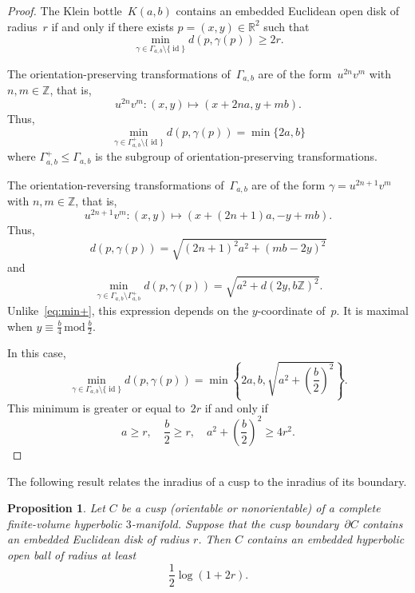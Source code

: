 \documentclass[11pt,reqno]{amsart}
\newtheorem{proposition}[theorem]{Proposition}
\theoremstyle{definition}
\numberwithin{equation}{section}
\newcommand\R {{\mathbb R}}
\newcommand\Z {{\mathbb Z}}
\DeclareMathOperator{\id}{id}
\numberwithin{equation}{section}
\begin{document}
\begin{proof}
The Klein bottle~$K(a,b)$ contains an embedded Euclidean open disk of radius~$r$ if and only if there exists $p=(x,y) \in \R^2$ such that
\[
\min_{\gamma \in \Gamma_{a,b} \setminus \{ \id \}} d(p,\gamma(p)) \geq 2r.
\]

The orientation-preserving transformations of~$\Gamma_{a,b}$ are of the form~$u^{2n} v^m$ with $n,m \in \Z$, that is,
\[
u^{2n} v^m:(x,y) \mapsto (x+2na,y+mb).
\]
Thus, 
\begin{equation} \label{eq:min+}
\min_{\gamma \in \Gamma^+_{a,b} \setminus \{ \id \}} d(p,\gamma(p)) = \min\{2a,b\}
\end{equation}
where $\Gamma^+_{a,b} \leqslant \Gamma_{a,b}$ is the subgroup of orientation-preserving transformations.

The orientation-reversing transformations of~$\Gamma_{a,b}$ are of the form $\gamma=u^{2n+1}v^m$ with $n,m \in \Z$, that is,
\[
u^{2n+1}v^m:(x,y) \mapsto (x+(2n+1)a,-y+mb).
\]
Thus, 
\[
d(p,\gamma(p)) = \sqrt{(2n+1)^2 a^2 + (mb-2y)^2}
\]
and
\[
\min_{\gamma \in \Gamma_{a,b} \setminus \Gamma^+_{a,b}} d(p,\gamma(p)) = \sqrt{a^2+d(2y,b\Z)^2}.
\]
Unlike~\eqref{eq:min+}, this expression depends on the $y$-coordinate of~$p$.
It is maximal when $y \equiv \frac{b}{4} \, \text{mod} \, \frac{b}{2}$.

In this case, 
\[
\min_{\gamma \in \Gamma_{a,b} \setminus \{ \id \}} d(p,\gamma(p)) = \min \left\{ 2a,b,\sqrt{a^2+\left( \frac{b}{2} \right)^2} \right\}.
\]
This minimum is greater or equal to~$2r$ if and only if
\[
a \geq r, \quad \frac{b}{2} \geq r, \quad a^2 + \left(\frac{b}{2} \right)^2 \geq 4r^2.
\]
\end{proof}


The following result relates the inradius of a cusp to the inradius of its boundary.

\begin{proposition} \label{prop:ballC}
Let $C$ be a cusp (orientable or nonorientable) of a complete finite-volume hyperbolic $3$-manifold.
Suppose that the cusp boundary~$\partial C$ contains an embedded Euclidean disk of radius $r$.
Then $C$ contains an embedded hyperbolic open ball of radius at least
\[
\frac{1}{2} \log(1+2r).
\]
\end{proposition}
\end{document}
